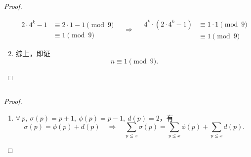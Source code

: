 \documentclass[UTF8]{ctexart}
\begin{document}
\begin{proof}
\begin{enumerate}
\[\begin{aligned}
                2\cdot 4^{k} - 1
                & \equiv 
                2\cdot 1 -1 \pmod{9}\\
                & \equiv
                1 \pmod{9}
            \end{aligned}
            \quad \Rightarrow \quad
            \begin{aligned}
                4^{k}\cdot (2\cdot 4^{k} -1)
                & \equiv
                1\cdot 1 \pmod{9}\\
                & \equiv
                1 \pmod{9}
            \end{aligned}  
        \]
        \item []综上，即证
        \[
            n \equiv 1 \pmod{9} .
        \]
    \end{enumerate}
\end{proof}

\subsection{}   %
\begin{proof}
    \begin{enumerate}
        \item []$\forall\ p,\ \sigma(p) = p+1,\ \phi(p) = p-1,\ d(p) = 2$，有
        \[
            \sigma(p) = \phi (p) + d(p)
            \quad \Rightarrow \quad
            \sum\limits_{p\leq x} \sigma(p)
            =\sum\limits_{p\leq x} \phi(p)+
            \sum\limits_{p\leq x} d(p).
        \]
    \end{enumerate}
\end{proof}
\end{document}
